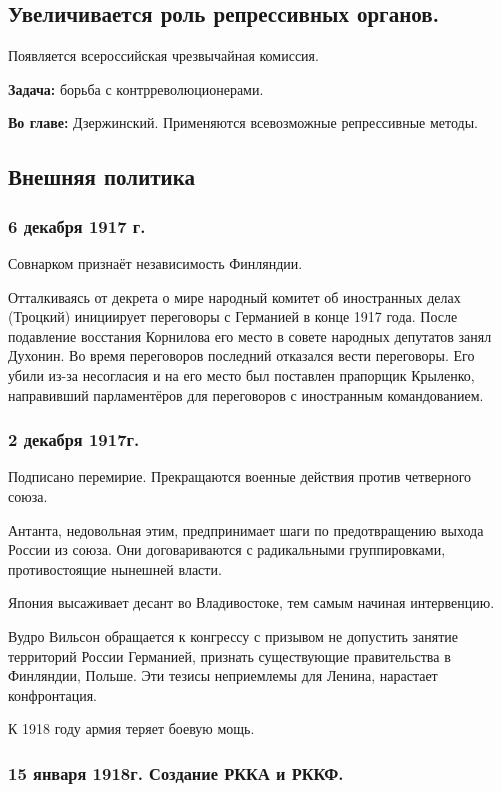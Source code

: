 \subsection{Увеличивается роль репрессивных органов.}

Появляется всероссийская чрезвычайная комиссия.

\textbf{Задача:} борьба с контрреволюционерами.

\textbf{Во главе:} Дзержинский.
Применяются всевозможные репрессивные методы.

\subsection{Внешняя политика}

\subsubsection{\textbf{6 декабря 1917 г.}}

Совнарком признаёт независимость Финляндии.

Отталкиваясь от декрета о мире народный комитет об иностранных делах (Троцкий) инициирует переговоры с Германией в конце 1917 года. После подавление восстания Корнилова его место в совете народных депутатов занял Духонин. Во время переговоров последний отказался вести переговоры. Его убили из-за несогласия и на его место был поставлен прапорщик Крыленко, направивший парламентёров для переговоров с иностранным командованием.

\subsubsection{\textbf{2 декабря 1917г.}}

Подписано перемирие. Прекращаются военные действия против четверного союза.

Антанта, недовольная этим, предпринимает шаги по предотвращению выхода России из союза. Они договариваются с радикальными группировками, противостоящие нынешней власти.

Япония высаживает десант во Владивостоке, тем самым начиная интервенцию.

Вудро Вильсон обращается к конгрессу с призывом не допустить занятие территорий России Германией, признать существующие правительства в Финляндии, Польше. Эти тезисы неприемлемы для Ленина, нарастает конфронтация.

К 1918 году армия теряет боевую мощь.

\subsubsection{\textbf{15 января 1918г. Создание РККА и РККФ.}}

